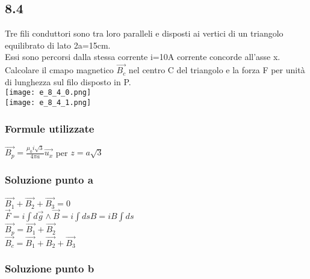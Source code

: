 \documentclass[../../main.tex]{subfiles}
\begin{document}
\subsection*{8.4}
Tre fili conduttori sono tra loro paralleli e disposti ai vertici di un triangolo equilibrato di lato 2a=15cm.
\\Essi sono percorsi dalla stessa corrente i=10A corrente concorde all'asse x.
\\Calcolare il cmapo magnetico $\vec{B_c}$ nel centro C del triangolo e la forza F per unità di lunghezza sul filo disposto in P.
\\\texttt{[image: e\_8\_4\_0.png]}
\\\texttt{[image: e\_8\_4\_1.png]}
\subsubsection*{Formule utilizzate}
$\vec{B_p} = \frac{\mu_0 i \sqrt{3}}{4\pi a}\vec{u_x}$ per $z = a\sqrt{3}$
\subsubsection*{Soluzione punto a}
$\vec{B_1}+\vec{B_2}+\vec{B_3}=0$
\\$\vec{F}=i\int d\vec{g}\wedge\vec{B} = i\int dsB =iB\int ds$
\\$\vec{B_p} =\vec{B_1}+\vec{B_2}$
\\$\vec{B_c} = \vec{B_1}+\vec{B_2}+\vec{B_3}$ 
\subsubsection*{Soluzione punto b}
\newpage
\end{document}
